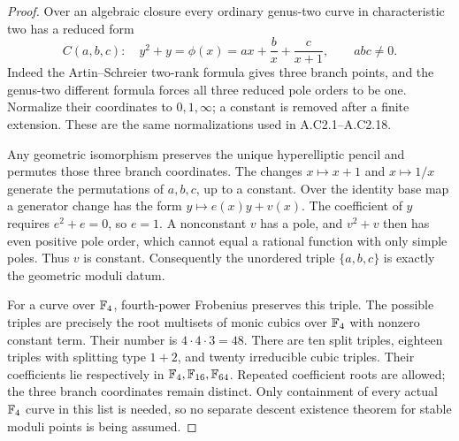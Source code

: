 \begin{proof}
Over an algebraic closure every ordinary genus-two
curve in characteristic two has a reduced form
\[
 C(a,b,c):\quad y^2+y=\phi(x)=ax+\frac bx+\frac c{x+1},
                        \qquad abc\ne0.                        \tag{C2.66}
\]
Indeed the Artin--Schreier two-rank formula gives
three branch points, and the genus-two different
formula forces all three reduced pole orders
to be one. Normalize their coordinates to
$0,1,\infty$; a constant is removed after a finite
extension. These are the same normalizations
used in A.C2.1--A.C2.18.

Any geometric isomorphism preserves the unique
hyperelliptic pencil and permutes those three
branch coordinates. The changes $x\mapsto x+1$
and $x\mapsto1/x$ generate the permutations
of $a,b,c$, up to a constant.
Over the identity base map a generator change
has the form $y\mapsto e(x)y+v(x)$.
The coefficient of $y$ requires $e^2+e=0$,
so $e=1$. A nonconstant $v$ has a pole, and
$v^2+v$ then has even positive pole order,
which cannot equal a rational function with
only simple poles. Thus $v$ is constant.
Consequently the unordered triple $\{a,b,c\}$
is exactly the geometric moduli datum.

For a curve over $\mathbb F_4$, fourth-power Frobenius
preserves this triple. The possible triples
are precisely the root multisets of monic
cubics over $\mathbb F_4$ with nonzero constant term.
Their number is $4\cdot4\cdot3=48$.
There are ten split triples, eighteen triples
with splitting type $1+2$, and twenty irreducible
cubic triples. Their coefficients lie respectively
in $\mathbb F_4,\mathbb F_{16},\mathbb F_{64}$.
Repeated coefficient roots are allowed; the
three branch coordinates remain distinct.
Only containment of every actual $\mathbb F_4$ curve
in this list is needed, so no separate descent
existence theorem for stable moduli points is
being assumed.


\end{proof}
